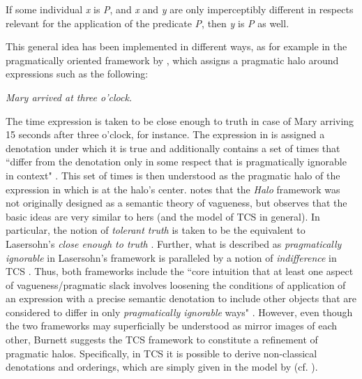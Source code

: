 \documentclass[output=paper]{langsci/langscibook}
\begin{document}
\ea\label{ex:harris:17}
	If some individual \textit{x} is \textit{P}, and \textit{x} and \textit{y} are only imperceptibly different in respects relevant for the application of the predicate \textit{P}, then \textit{y} is \textit{P} as well. \citep[348]{Cobreros2012}
\z

This general idea has been implemented in different ways, as for example in the pragmatically oriented framework by \citet{Lasersohn1999}, which assigns a pragmatic halo around expressions such as the following:

\ea\label{ex:harris:18}
	\itshape Mary arrived at three o'clock.
\z

The time expression is taken to be close enough to truth in case of Mary arriving 15 seconds after three o'clock, for instance. The expression in  is assigned a denotation under which it is true and additionally contains a set of times that ``differ from the denotation only in some respect that is pragmatically ignorable in context" \citep[526]{Lasersohn1999}. This set of times is then understood as the pragmatic halo of the expression in  which is at the halo's center. \textcite[29]{Burnett2017} notes that the \textit{Halo} framework was not originally designed as a semantic theory of vagueness, but observes that the basic ideas are very similar to hers (and the model of TCS in general). In particular, the notion of \textit{tolerant truth} is taken to be the equivalent to Lasersohn's \textit{close enough to truth} \citep[32]{Burnett2017}. Further, what is described as \textit{pragmatically ignorable} in Lasersohn's framework is paralleled by a notion of \textit{indifference} in TCS \citep[32]{Burnett2017}. Thus, both frameworks include the ``core intuition that at least one aspect of vagueness/pragmatic slack involves loosening the conditions of application of an expression with a precise semantic denotation to include other objects that are considered to differ in only \textit {pragmatically ignorable} ways" \citep[32--33]{Burnett2017}. However, even though the two frameworks may superficially be understood as mirror images of each other, Burnett suggests the TCS framework to constitute a refinement of pragmatic halos. Specifically, in TCS it is possible to derive non-classical denotations and orderings, which are simply given in the model by \citet{Lasersohn1999} (cf. \citealt[33]{Burnett2017}).
\end{document}
